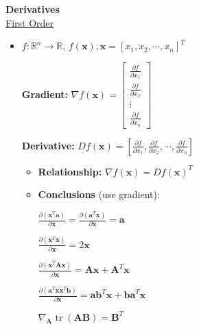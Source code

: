 
{\LARGE \textbf{Derivatives}}\\

{\large \underline{First Order }}
\begin{itemize}

\item $f: \mathbb{R}^{n} \rightarrow \mathbb{R}$, $f(\boldsymbol{x}), \boldsymbol{x}=\left[x_{1}, x_{2}, \cdots, x_{n}\right]^{T}$

\textbf{Gradient: } 
$\nabla f(\bm{x})=\left[\begin{array}{c}
\frac{\partial f}{\partial x_1} \\ \frac{\partial f}{\partial x_2} \\ \vdots \\
\frac{\partial f}{\partial x_n}
\end{array}\right]$

\textbf{Derivative:}
$Df(\bm{x}) = \left[ {\frac{{\partial f}}{{\partial {x_1}}},\frac{{\partial f}}{{\partial {x_2}}}, \cdots ,\frac{{\partial f}}{{\partial {x_n}}}} \right]$

\begin{itemize}
\item \textbf{Relationship:} $\nabla f(\bm{x})=D f(\bm{x})^{T}$

\item \textbf{Conclusions} (use gradient):

$\frac{\partial\left(\boldsymbol{x}^{T} \boldsymbol{a}\right)}{\partial \boldsymbol{x}}=\frac{\partial\left(\boldsymbol{a}^{T} \boldsymbol{x}\right)}{\partial \boldsymbol{x}}=\boldsymbol{a}$

$\frac{\partial\left(\boldsymbol{x}^{T} \boldsymbol{x}\right)}{\partial \boldsymbol{x}}=2 \boldsymbol{x}$

$\frac{\partial\left(\boldsymbol{x}^{T} \mathbf{A} \boldsymbol{x}\right)}{\partial \boldsymbol{x}}=\mathbf{A} \boldsymbol{x}+\mathbf{A}^{T} \boldsymbol{x}$

$\frac{\partial\left(\boldsymbol{a}^{T} \boldsymbol{x} \boldsymbol{x}^{T} \boldsymbol{b}\right)}{\partial \boldsymbol{x}}=\boldsymbol{a} \boldsymbol{b}^{T} \boldsymbol{x}+\boldsymbol{b a}^{T} \boldsymbol{x}$

$\nabla_{\mathbf{A}} \operatorname{tr} (\mathbf{AB})=\mathbf{B}^{T}$
\end{itemize}
\end{itemize}


